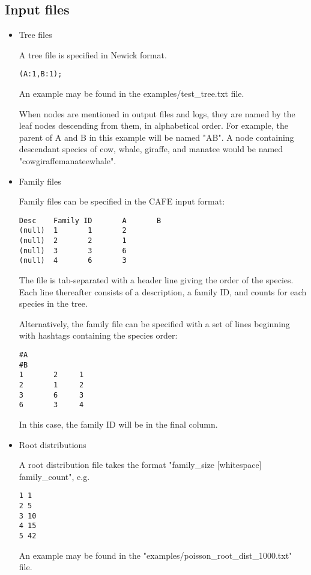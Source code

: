 \documentclass{article}
\begin{document}
\subsection{Input files}
\begin{itemize}
\item{Tree files}

A tree file is specified in Newick format.

\begin{lstlisting}
(A:1,B:1);
\end{lstlisting}
An example may be found in the examples/test\_tree.txt file.

When nodes are mentioned in output files and logs, they are named by the leaf nodes descending from them, in alphabetical order. For example, the parent of A and B in this example will be named "AB". A node containing descendant species of cow, whale, giraffe, and manatee would be named "cowgiraffemanateewhale".

\item{Family files} \label{familyfile}

Family files can be specified in the CAFE input format:

\begin{lstlisting}
Desc    Family ID       A       B
(null)  1       1       2
(null)  2       2       1
(null)  3       3       6
(null)  4       6       3
\end{lstlisting}
The file is tab-separated with a header line giving the order of the species. Each line thereafter consists of a description, a family ID, and counts for each species in the tree.

Alternatively, the family file can be specified with a set of lines beginning with hashtags containing the species order:

\begin{lstlisting}
#A
#B
1       2     1
2       1     2
3       6     3
6       3     4
\end{lstlisting}

In this case, the family ID will be in the final column.

\item{Root distributions} \label{rootdist}

A root distribution file takes the format "family\_size [whitespace] family\_count", e.g.
\begin{lstlisting}
1 1
2 5
3 10
4 15
5 42
\end{lstlisting}
An example may be found in the "examples/poisson\_root\_dist\_1000.txt" file.


\end{itemize}
\end{document}
